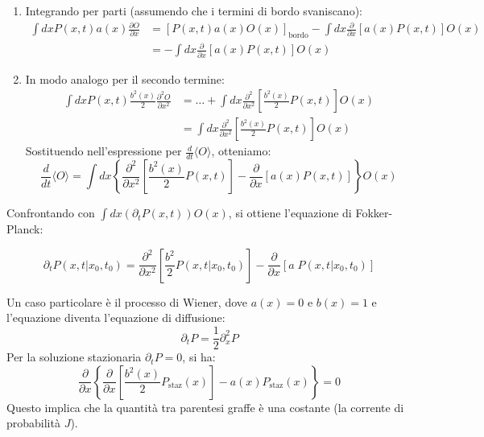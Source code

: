 \begin{enumerate}
    \item Integrando per parti (assumendo che i termini di bordo svaniscano):
\begin{equation}
\begin{aligned}
\int dx P(x,t) a(x)\frac{\partial O}{\partial x} &= [P(x,t)a(x)O(x)]_{\text{bordo}} - \int dx \frac{\partial}{\partial x}[a(x)P(x,t)]O(x) \\
&= - \int dx \frac{\partial}{\partial x}[a(x)P(x,t)]O(x)
\end{aligned}
\end{equation}
\item In modo analogo per il secondo termine:
\begin{equation}
\begin{aligned}
\int dx P(x,t) \frac{b^2(x)}{2}\frac{\partial^2 O}{\partial x^2} &= \dots + \int dx \frac{\partial^2}{\partial x^2}\left[\frac{b^2(x)}{2}P(x,t)\right]O(x) \\
&= \int dx \frac{\partial^2}{\partial x^2}\left[\frac{b^2(x)}{2}P(x,t)\right]O(x)
\end{aligned}
\end{equation}
Sostituendo nell'espressione per $\frac{d}{dt}\langle O \rangle$, otteniamo:
\begin{equation}
\frac{d}{dt}\langle O \rangle = \int dx \left\{ \frac{\partial^2}{\partial x^2}\left[\frac{b^2(x)}{2}P(x,t)\right] - \frac{\partial}{\partial x}[a(x)P(x,t)] \right\} O(x)
\end{equation}
\end{enumerate}
Confrontando con $\int dx (\partial_t P(x,t)) O(x)$, si ottiene l'equazione di Fokker-Planck:
\begin{tcolorbox}[colback=colorA!5,colframe=colorA]
\begin{equation}
\partial_t P(x,t|x_0,t_0) = \frac{\partial^2}{\partial x^2}\left[\frac{b^2}{2}P(x,t|x_0,t_0)\right] - \frac{\partial}{\partial x}[a \;P(x,t|x_0,t_0)]
\end{equation}
\end{tcolorbox}
Un caso particolare è il processo di Wiener, dove $a(x)=0$ e $b(x)=1$ e l'equazione diventa l'equazione di diffusione:
\begin{equation}
\partial_t P = \frac{1}{2} \partial_x^2 P
\end{equation}
Per la soluzione stazionaria $\partial_t P = 0$, si ha:
\begin{equation}
\frac{\partial}{\partial x} \left\{ \frac{\partial}{\partial x}\left[\frac{b^2(x)}{2}P_{\text{staz}}(x)\right] - a(x)P_{\text{staz}}(x) \right\} = 0
\end{equation}
Questo implica che la quantità tra parentesi graffe è una costante (la corrente di probabilità $J$).

